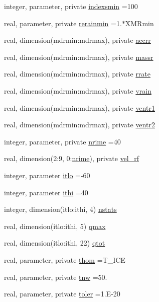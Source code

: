 \begin{DoxyCompactItemize}
\item 
integer, parameter, private \hyperlink{namespacemodule__microphysics_a48966fa99ac5a7268ef5f473a675eeb2}{indexsmin} =100
\item 
real, parameter, private \hyperlink{namespacemodule__microphysics_a86f747f0e2a77aee3a2c8270a0f2fc6d}{rerainmin} =1.$\ast$X\+M\+Rmin
\item 
real, dimension(mdrmin\+:mdrmax), private \hyperlink{namespacemodule__microphysics_ac58ee32a06efc573a2c380d77cd4e5c5}{accrr}
\item 
real, dimension(mdrmin\+:mdrmax), private \hyperlink{namespacemodule__microphysics_a3b33f42c343ef0fbfe6585bbeccc99c7}{massr}
\item 
real, dimension(mdrmin\+:mdrmax), private \hyperlink{namespacemodule__microphysics_a481bd873812c291fe7ddce951cf6440d}{rrate}
\item 
real, dimension(mdrmin\+:mdrmax), private \hyperlink{namespacemodule__microphysics_aa57b0e61801d417b3866f69269e886b2}{vrain}
\item 
real, dimension(mdrmin\+:mdrmax), private \hyperlink{namespacemodule__microphysics_a17a8a4c24d0e7bd36c202103141dc1f8}{ventr1}
\item 
real, dimension(mdrmin\+:mdrmax), private \hyperlink{namespacemodule__microphysics_a95936805512ce6f13a072461b3694020}{ventr2}
\item 
integer, parameter, private \hyperlink{namespacemodule__microphysics_aaea427462ab04c90a0e8188c08e102c2}{nrime} =40
\item 
real, dimension(2\+:9, 0\+:\hyperlink{namespacemodule__microphysics_aaea427462ab04c90a0e8188c08e102c2}{nrime}), private \hyperlink{namespacemodule__microphysics_a2979744b6713e1ea75813ce1329967c6}{vel\+\_\+rf}
\item 
integer, parameter \hyperlink{namespacemodule__microphysics_ada649157311835e0fa4c4d24057d5aa4}{itlo} =-\/60
\item 
integer, parameter \hyperlink{namespacemodule__microphysics_aac47e36935bcfaf088e6d0cb266d74f5}{ithi} =40
\item 
integer, dimension(itlo\+:ithi, 4) \hyperlink{namespacemodule__microphysics_a8893b7e5e0d04741a7e155c999480f92}{nstats}
\item 
real, dimension(itlo\+:ithi, 5) \hyperlink{namespacemodule__microphysics_ae783e9f9007b2cc25590b9e967461ef7}{qmax}
\item 
real, dimension(itlo\+:ithi, 22) \hyperlink{namespacemodule__microphysics_a1ca8e1d6e01d0b1bfb406608ccfeff5d}{qtot}
\item 
real, parameter, private \hyperlink{namespacemodule__microphysics_ae6cb25c6ef4d76e53988a1390c99bacb}{thom} =T\+\_\+\+I\+CE
\item 
real, parameter, private \hyperlink{namespacemodule__microphysics_a7759795319d20ea93e3ceb6755333fa1}{tnw} =50.
\item 
real, parameter, private \hyperlink{namespacemodule__microphysics_a14f276771aea75d768df7e65c93e0092}{toler} =1.\+E-\/20
\end{DoxyCompactItemize}


